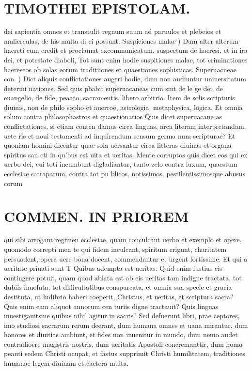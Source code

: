 \documentclass{article}
\begin{document}
\begin{pages}
\section*{TIMOTHEI EPISTOLAM. }
\marginpar{[ p.159 ]}\pstart dei sapientia omnes et transtulit regnum suum ad paruulos et plebeios et mulierculas, de his multa di ci possunt.  \pend\pstart Suspiciones malae ) Dum alter alterum haereti cum credit et proclamat excommunicatum, suspectum de haeresi, et in ira dei, et potestate diaboli, Tot sunt enim hodie suspitiones malae, tot criminationes haereseos ob solas eorum tradituones et quaestiones sophisticas.  \pend\pstart Superuacneae con. ) Dict aliquis conflictationes augeri hodie, dum non audiuntur uniuersitatum determi nationes. Sed quis pbabit superuacaneas cum sint de le ge dei, de euangelio, de fide, peaato, sacramentis, libero arbitrio. Item de solis scripturis diuinis, non de philo sopho et auerroë, astrologia, metaphysica, logica. Et omnia solum contra philosophastros et quaestionarios Quis dicet superuacane as conflictationes, si etiam conten damus circa linguas, arca literam interpretandam, uete ris et noui testamenti ad inquirendum sensum germa num scripturae? Et quoniam homini dicentur quae sola uersantur circa litteras diuinas et organa spiritus san cti in qu'bus est uita et ueritas.  \pend\pstart Mente corruptos quis dicet eos qui ex uerbo dei, cui toti incumbunt digladiantur, tanto zelo contra luxum, quaestum ecclesiae satraparum, contra tot pu blicos, notissimos, pestilentissimosque abusus corum  \pend
\section*{COMMEN. IN PRIOREM }
\marginpar{[ p.160 ]}\pstart qui sibi arrogant regimen ecclesiae, quam conculcant uerbo et exemplo et opere, quomodo correpti men te qui fidem inculcant, spiritum erigunt, charitatem persuadent, opera uere bona docent, commendantur et urgent fortissime.  \pend\pstart Et qui a ueritate priuati sunt T Quibus adempta est ueritas. Quid enim iustius eis contingere potuit, quam quod ablata est ab eis ueritas tam indigne tractata, tot dubiis inuoluta, tot difficultatibus conspurcata, et omnia sua specie et gracia destituta, ut ludibrio haberi coeperit, Christus, et ueritas, et scriptura sacra? Quis enim eam aliquot annorum cen turiis digne tractauit? Quis linguas inuestigauitsine quibus nihil agitur in sacris? Sed defuerunt libri, prae ceptores, imo studiosi sacrarum rerum deerant, dum humana omnes et uana mirantur, dum honores et diuitias ambiunt, et fides non inuenitur in mundo, dum nemo audet contradioere magistris nostris, dum ueritatis Apostoli concremanttir, dum homo peauti sedem Christi ocupat, et fastus supprimit Christi humilitatem, traditiones humanae legem diuinam et caetera multa.  \pend
{}
{}

\end{pages}
\end{document}
